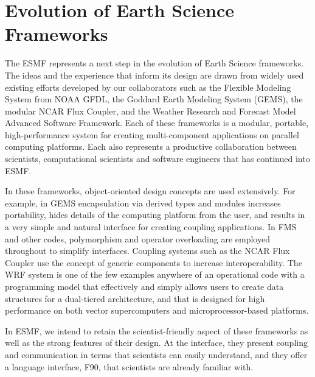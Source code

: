 \section{Evolution of Earth Science Frameworks}
\label{sec:background}

The ESMF represents a next step in the evolution of Earth Science
frameworks.  The ideas and the experience that inform its design
are drawn from widely used existing efforts developed by our collaborators 
such as the Flexible Modeling System from NOAA GFDL, the Goddard 
Earth Modeling System (GEMS), the
modular NCAR Flux Coupler, and the Weather Research and Forecast Model
Advanced Software Framework.  Each of these frameworks is a modular,
portable, high-performance system for creating multi-component applications
on parallel computing platforms.  Each also represents a productive
collaboration between scientists, computational scientists and software
engineers that has continued into ESMF.

In these frameworks, object-oriented design concepts are used extensively.  
For example, in GEMS encapsulation 
via derived types and modules increases portability, hides details of the 
computing platform from the user, and results in a very simple and natural
interface for creating coupling applications.  
In FMS and other codes, polymorphism and operator overloading are 
employed throughout to simplify interfaces.  Coupling systems such 
as the NCAR Flux Coupler use the concept of generic components to
increase interoperability.  The WRF system is one of the few 
examples anywhere of an operational code with a programming model 
that effectively and simply allows users to create data structures 
for a dual-tiered architecture, and that is designed for high performance
on both vector supercomputers and microprocessor-based platforms.

In ESMF, we intend to retain the scientist-friendly 
aspect of these frameworks as well as the strong features 
of their design.  At the interface, they present coupling and
communication in terms that scientists can easily understand, and they 
offer a language interface, F90, that scientists are already familiar 
with.  




